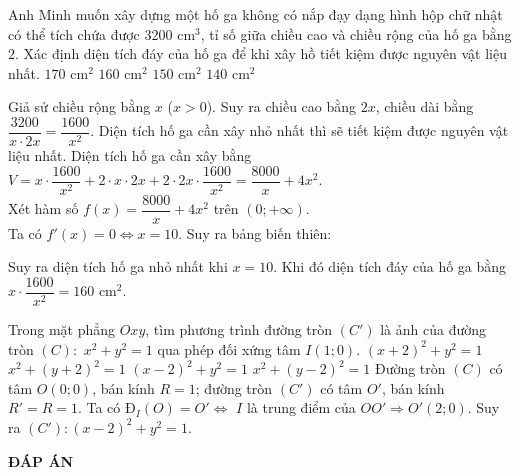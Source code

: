 \begin{ex}%
Anh Minh muốn xây dựng một hố ga không có nắp đạy dạng hình hộp chữ nhật có thể tích chứa được $3200$ cm$^3$, tỉ số giữa chiều cao và chiều rộng của hố ga bằng $2$. Xác định diện tích đáy của hố ga để khi xây hồ tiết kiệm được nguyên vật liệu nhất.
\choice
{$170$ cm$^2$}
{\True $160$ cm$^2$}
{$150$ cm$^2$}
{$140$ cm$^2$}
\loigiai
{
\immini
{
Giả sử chiều rộng bằng $x$ ($x>0$). Suy ra chiều cao bằng $2x$, chiều dài bằng $\dfrac{3200}{x\cdot 2x}=\dfrac{1600}{x^2}$.
Diện tích hố ga cần xây nhỏ nhất thì sẽ tiết kiệm được nguyên vật liệu nhất.
Diện tích hố ga cần xây bằng\\
$V=x\cdot\dfrac{1600}{x^2}+2\cdot x\cdot 2x+2\cdot 2x\cdot\dfrac{1600}{x^2}=\dfrac{8000}{x}+4x^2$.\\
Xét hàm số $f(x)=\dfrac{8000}{x}+4x^2$ trên $(0; +\infty)$.\\
Ta có $f'(x)=0\Leftrightarrow x=10$.
Suy ra bảng biến thiên:
\begin{center}
\end{center}
Suy ra diện tích hố ga nhỏ nhất khi $x=10$. Khi đó diện tích đáy của hố ga bằng $x\cdot\dfrac{1600}{x^2}=160$ cm$^2$.
}
{
}
}
\end{ex}

\begin{ex}%
Trong mặt phẳng $Oxy$, tìm phương trình đường tròn $(C')$ là ảnh của đường tròn $(C):$ $x^2+y^2=1$ qua phép đối xứng tâm $I(1; 0)$.
\choice
{$(x+2)^2+y^2=1$}
{$x^2+(y+2)^2=1$}
{\True $(x-2)^2+y^2=1$}
{$x^2+(y-2)^2=1$}
\loigiai
{Đường tròn $(C)$ có tâm $O(0; 0)$, bán kính $R=1$; đường tròn $(C')$ có tâm $O'$, bán kính $R'=R=1$. Ta có $\mathrm{\text{Đ}}_I(O)=O'\Leftrightarrow$ $I$ là trung điểm của $OO'\Rightarrow O'(2; 0)$. Suy ra $(C'): (x-2)^2+y^2=1$.
}
\end{ex}
\newpage
\begin{center}
	\textbf{ĐÁP ÁN}
\end{center}
\begin{multicols}{10}
	
\end{multicols}

